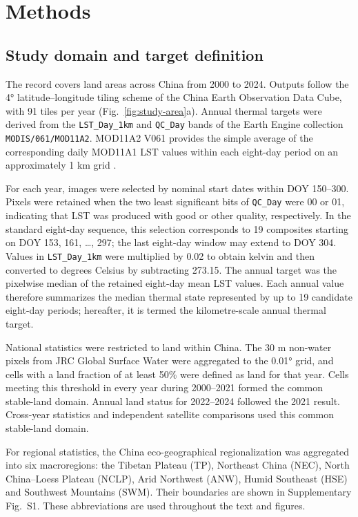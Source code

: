 \section{Methods}

\subsection{Study domain and target definition}

The record covers land areas across China from 2000 to 2024. Outputs follow the 4° latitude--longitude tiling scheme of the China Earth Observation Data Cube, with 91 tiles per year (Fig.~\ref*{fig:study-area}a). Annual thermal targets were derived from the \texttt{LST\_Day\_1km} and \texttt{QC\_Day} bands of the Earth Engine collection \texttt{MODIS/061/MOD11A2}. MOD11A2 V061 provides the simple average of the corresponding daily MOD11A1 LST values within each eight-day period on an approximately 1 km grid \parencite{lpdaacMod11a2,wan2002modisValidation,wan2008modis}.

For each year, images were selected by nominal start dates within DOY 150--300. Pixels were retained when the two least significant bits of \texttt{QC\_Day} were 00 or 01, indicating that LST was produced with good or other quality, respectively. In the standard eight-day sequence, this selection corresponds to 19 composites starting on DOY 153, 161, \ldots, 297; the last eight-day window may extend to DOY 304. Values in \texttt{LST\_Day\_1km} were multiplied by 0.02 to obtain kelvin and then converted to degrees Celsius by subtracting 273.15. The annual target was the pixelwise median of the retained eight-day mean LST values. Each annual value therefore summarizes the median thermal state represented by up to 19 candidate eight-day periods; hereafter, it is termed the kilometre-scale annual thermal target.

National statistics were restricted to land within China. The 30 m non-water pixels from JRC Global Surface Water were aggregated to the 0.01° grid, and cells with a land fraction of at least 50\% were defined as land for that year. Cells meeting this threshold in every year during 2000--2021 formed the common stable-land domain. Annual land status for 2022--2024 followed the 2021 result. Cross-year statistics and independent satellite comparisons used this common stable-land domain.

For regional statistics, the China eco-geographical regionalization was aggregated into six macroregions: the Tibetan Plateau (TP), Northeast China (NEC), North China--Loess Plateau (NCLP), Arid Northwest (ANW), Humid Southeast (HSE) and Southwest Mountains (SWM). Their boundaries are shown in Supplementary Fig.~S1. These abbreviations are used throughout the text and figures.

